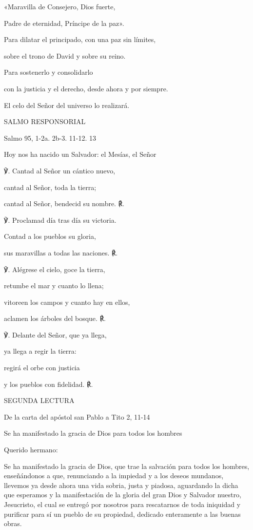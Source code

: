 \documentclass[]{article}
\begin{document}
«Maravilla de Consejero, Dios fuerte,

Padre de eternidad, Príncipe de la paz».

Para dilatar el principado, con una paz sin límites,

sobre el trono de David y sobre su reino.

Para sostenerlo y consolidarlo

con la justicia y el derecho, desde ahora y por siempre.

El celo del Señor del universo lo realizará.

SALMO RESPONSORIAL

Salmo 95, 1-2a. 2b-3. 11-12. 13

Hoy nos ha nacido un Salvador: el Mesías, el Señor

℣. Cantad al Señor un cántico nuevo,

cantad al Señor, toda la tierra;

cantad al Señor, bendecid su nombre. ℟.

℣. Proclamad día tras día su victoria.

Contad a los pueblos su gloria,

sus maravillas a todas las naciones. ℟.

℣. Alégrese el cielo, goce la tierra,

retumbe el mar y cuanto lo llena;

vitoreen los campos y cuanto hay en ellos,

aclamen los árboles del bosque. ℟.

℣. Delante del Señor, que ya llega,

ya llega a regir la tierra:

regirá el orbe con justicia

y los pueblos con fidelidad. ℟.

SEGUNDA LECTURA

De la carta del apóstol san Pablo a Tito 2, 11-14

Se ha manifestado la gracia de Dios para todos los hombres

Querido hermano:

Se ha manifestado la gracia de Dios, que trae la salvación para todos
los hombres, enseñándonos a que, renunciando a la impiedad y a los
deseos mundanos, llevemos ya desde ahora una vida sobria, justa y
piadosa, aguardando la dicha que esperamos y la manifestación de la
gloria del gran Dios y Salvador nuestro, Jesucristo, el cual se entregó
por nosotros para rescatarnos de toda iniquidad y purificar para sí un
pueblo de su propiedad, dedicado enteramente a las buenas obras.
\end{document}
